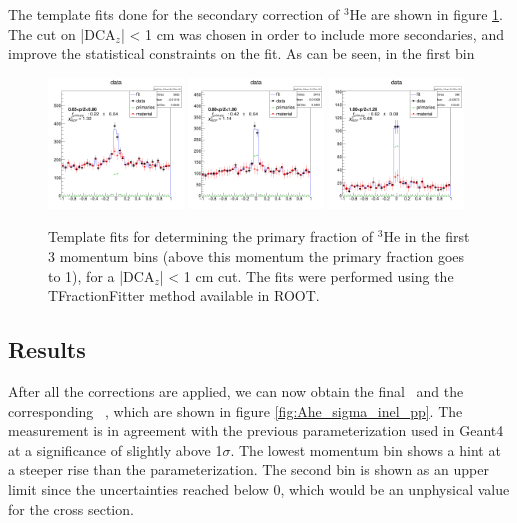 The template fits done for the secondary correction of $^3\mathrm{He}$ are shown in figure \ref{fig:Template_fits_he}. The cut on |DCA$_z$| < 1 cm was chosen in order to include more secondaries, and improve the statistical constraints on the fit. As can be seen, in the first bin 

\begin{figure}
    \centering
    \includegraphics[width=0.32\textwidth]{figures/he3_template_fits/TemplateFitHe3_0.65<p<0.8_rebin_5.png}
    \includegraphics[width=0.32\textwidth]{figures/he3_template_fits/TemplateFitHe3_0.8<p<1.0_rebin_5.png}
    \includegraphics[width=0.32\textwidth]{figures/he3_template_fits/TemplateFitHe3_1.0<p<1.2_rebin_5.png}
    \caption{Template fits for determining the primary fraction of $^3\mathrm{He}$ in the first 3 momentum bins (above this momentum the primary fraction goes to 1), for a |DCA$_z$| < 1 cm cut. The fits were performed using the TFractionFitter method available in ROOT.}
    \label{fig:Template_fits_he}
\end{figure}

\subsection{Results}
After all the corrections are applied, we can now obtain the final \ratio\ and the corresponding \sigmainel\ , which are shown in figure \ref{fig:Ahe_sigma_inel_pp}. The measurement is in agreement with the previous parameterization used in Geant4 at a significance of slightly above 1$\sigma$. The lowest momentum bin shows a hint at a steeper rise than the parameterization. The second bin is shown as an upper limit since the uncertainties reached below 0, which would be an unphysical value for the cross section. \\


